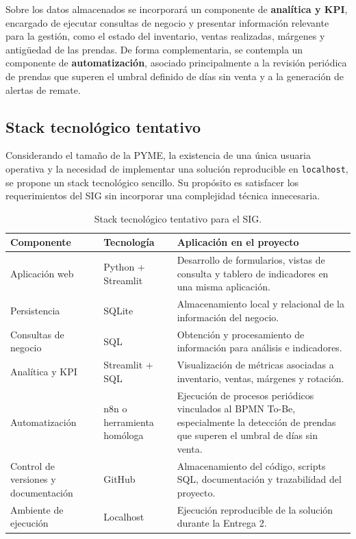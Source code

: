 \documentclass[11pt,letterpaper]{article}
\begin{document}
Sobre los datos almacenados se incorporará un componente de \textbf{analítica y KPI}, 
encargado de ejecutar consultas de negocio y presentar información relevante para la 
gestión, como el estado del inventario, ventas realizadas, márgenes y antigüedad de las 
prendas. De forma complementaria, se contempla un componente de 
\textbf{automatización}, asociado principalmente a la revisión periódica de prendas que 
superen el umbral definido de días sin venta y a la generación de alertas de remate.


\subsection*{Stack tecnológico tentativo}

Considerando el tamaño de la PYME, la existencia de una única usuaria operativa y la 
necesidad de implementar una solución reproducible en \texttt{localhost}, se propone un 
stack tecnológico sencillo. Su propósito es satisfacer los requerimientos 
del SIG sin incorporar una complejidad técnica innecesaria.

\begin{table}[htbp]
    \centering
    \caption{Stack tecnológico tentativo para el SIG.}
    \label{tab:stack_sig}
    \begin{tabularx}{\textwidth}{@{}p{3.2cm}p{3.2cm}X@{}}
        \toprule
        \textbf{Componente} & \textbf{Tecnología} & \textbf{Aplicación en el proyecto} \\
        \midrule
        Aplicación web &
        Python + Streamlit &
        Desarrollo de formularios, vistas de consulta y tablero de indicadores en una
        misma aplicación. \\

        Persistencia &
        SQLite &
        Almacenamiento local y relacional de la información del negocio. \\

        Consultas de negocio &
        SQL &
        Obtención y procesamiento de información para análisis e indicadores. \\

        Analítica y KPI &
        Streamlit + SQL &
        Visualización de métricas asociadas a inventario, ventas, márgenes y rotación. \\

        Automatización &
        n8n o herramienta homóloga &
        Ejecución de procesos periódicos vinculados al BPMN To-Be, especialmente la
        detección de prendas que superen el umbral de días sin venta. \\

        Control de versiones y documentación &
        GitHub &
        Almacenamiento del código, scripts SQL, documentación y trazabilidad del proyecto. \\

        Ambiente de ejecución &
        Localhost &
        Ejecución reproducible de la solución durante la Entrega 2. \\
        \bottomrule
    \end{tabularx}
\end{table}
\end{document}
